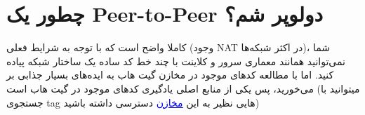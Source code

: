 \documentclass[]{article}
\begin{document}
\section*{{\titr  چطور یک Peer-to-Peer دولوپر شم؟}}

کاملا واضح است که با توجه به شرایط فعلی (وجود NAT در اکثر شبکه‌ها)، شما نمی‌توانید همانند معماری سرور و کلاینت با چند خط کد ساده یک ساختار شبکه  پیاده کنید. اما با مطالعه کد‌های موجود در مخازن گیت هاب به ایده‌های بسیار جذابی بر می‌خورید، پس یکی از منابع اصلی یادگیری  کدهای موجود در گیت هاب است (میتوانید با جستجوی tag هایی نظیر  به این \href{https://github.com/search?l=Java&q=p2p-network&type=Repositories}{\textcolor{blue}{\underline{مخازن}}}
 دسترسی داشته باشید) 
\end{document}
